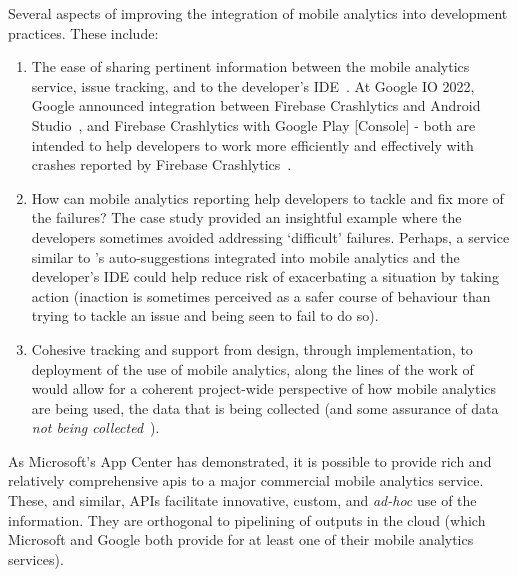 Several aspects of improving the integration of mobile analytics into development practices. These include:

\begin{enumerate}
    \item The ease of sharing pertinent information between the mobile analytics service, issue tracking, and to the developer's IDE~. At Google IO 2022, Google announced integration between Firebase Crashlytics and Android Studio~, and Firebase Crashlytics with Google Play [Console] - both are intended to help developers to work more efficiently and effectively with crashes reported by Firebase Crashlytics~.
    
    \item How can mobile analytics reporting help developers to tackle and fix more of the failures? The  case study provided an insightful example where the developers sometimes avoided addressing `difficult' failures. Perhaps, a service similar to 's auto-suggestions integrated into mobile analytics and the developer's IDE could help reduce risk of exacerbating a situation by taking action (inaction is sometimes perceived as a safer course of behaviour than trying to tackle an issue and being seen to fail to do so).
    
    \item Cohesive tracking and support from design, through implementation, to deployment of the use of mobile analytics, along the lines of the work of  would allow for a coherent project-wide perspective of how mobile analytics are being used, the data that is being collected (and some assurance of data \emph{not being collected}~).
\end{enumerate}

As Microsoft's App Center has demonstrated, it is possible to provide rich and relatively comprehensive \Glspl{api} to a major commercial mobile analytics service. %
These, and similar, APIs facilitate innovative, custom, and \emph{ad-hoc} use of the information. They are orthogonal to pipelining of outputs in the cloud (which Microsoft and Google both provide for at least one of their mobile analytics services).

